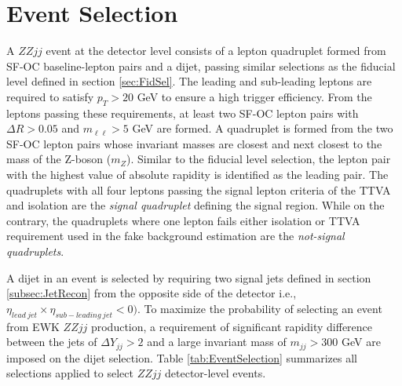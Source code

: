 \section{Event Selection}
\label{sec:EventSel}

A $ZZjj$ event at the detector level consists of a lepton quadruplet formed from SF-OC baseline-lepton pairs and a dijet, passing similar selections as the fiducial level defined in section \ref{sec:FidSel}. The leading and sub-leading leptons are required to satisfy $p_{T} > 20$ GeV to ensure a high trigger efficiency. From the leptons passing these requirements, at least two SF-OC lepton pairs with $\Delta R > 0.05$ and $m_{\ell\ell} > 5$ GeV are formed. A quadruplet is formed from the two SF-OC lepton pairs whose invariant masses are closest and next closest to the mass of the Z-boson ($m_{Z}$). Similar to the fiducial level selection, the lepton pair with the highest value of absolute rapidity is identified as the leading pair. The quadruplets with all four leptons passing the signal lepton criteria of the TTVA and isolation are the \textit{signal quadruplet} defining the signal region. While on the contrary, the quadruplets where one lepton fails either isolation or TTVA requirement used in the fake background estimation are the \textit{not-signal quadruplets}. 

A dijet in an event is selected by requiring two signal jets defined in section \ref{subsec:JetRecon} from the opposite side of the detector i.e., $\eta_{lead~jet} \times \eta_{sub-leading~jet} < 0)$. To maximize the probability of selecting an event from EWK $ZZjj$ production, a requirement of significant rapidity difference between the jets of $\Delta Y_{jj}> 2 $ and a large invariant mass of $m_{jj} > 300 $ GeV are imposed on the dijet selection. Table \ref{tab:EventSelection} summarizes all selections applied to select  $ZZjj$ detector-level events.


